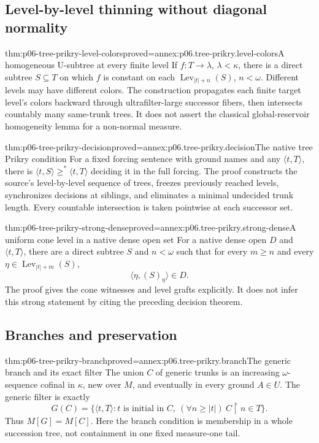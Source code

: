 \subsection{Level-by-level thinning without diagonal normality}

\begin{hblemma}{thm:p06-tree-prikry-level-colors}{proved=annex:p06.tree-prikry.level-colors}{A homogeneous U-subtree at every finite level}
If \(f:T\to\lambda\), \(\lambda<\kappa\), there is a direct
subtree \(S\subseteq T\) on which \(f\) is constant on each
\(\operatorname{Lev}_{|t|+n}(S)\), \(n<\omega\).
Different levels may have different colors. The construction propagates
each finite target level's colors backward through ultrafilter-large
successor fibers, then intersects countably many same-trunk trees.
It does not assert the classical global-reservoir homogeneity lemma for
a non-normal measure.
\end{hblemma}

\begin{hbtheorem}{thm:p06-tree-prikry-decision}{proved=annex:p06.tree-prikry.decision}{The native tree Prikry condition}
For a fixed forcing sentence with ground names and any
\(\langle t,T\rangle\), there is
\(\langle t,S\rangle\geq^*\langle t,T\rangle\) deciding it in the
full forcing. The proof constructs the source's level-by-level sequence
of trees, freezes previously reached levels, synchronizes decisions at
siblings, and eliminates a minimal undecided trunk length. Every
countable intersection is taken pointwise at each successor set.
\end{hbtheorem}

\begin{hblemma}{thm:p06-tree-prikry-strong-dense}{proved=annex:p06.tree-prikry.strong-dense}{A uniform cone level in a native dense open set}
For a native dense open \(D\) and \(\langle t,T\rangle\), there
are a direct subtree \(S\) and \(n<\omega\) such that for every
\(m\geq n\) and every
\(\eta\in\operatorname{Lev}_{|t|+m}(S)\),
\[
 \langle\eta,(S)_\eta\rangle\in D.
\]
The proof gives the cone witnesses and level grafts explicitly. It does
not infer this strong statement by citing the preceding decision theorem.
\end{hblemma}

\subsection{Branches and preservation}

\begin{hbtheorem}{thm:p06-tree-prikry-branch}{proved=annex:p06.tree-prikry.branch}{The generic branch and its exact filter}
The union \(C\) of generic trunks is an increasing \(\omega\)-sequence
cofinal in \(\kappa\), new over \(M\), and eventually in every
ground \(A\in U\). The generic filter is exactly
\[
 G(C)=\{\langle t,T\rangle:t\text{ is initial in }C,
       \ (\forall n\geq|t|)\ C\mathbin{\upharpoonright}n\in T\}.
\]
Thus \(M[G]=M[C]\). Here the branch condition is membership in a
whole succession tree, not containment in one fixed measure-one tail.
\end{hbtheorem}

